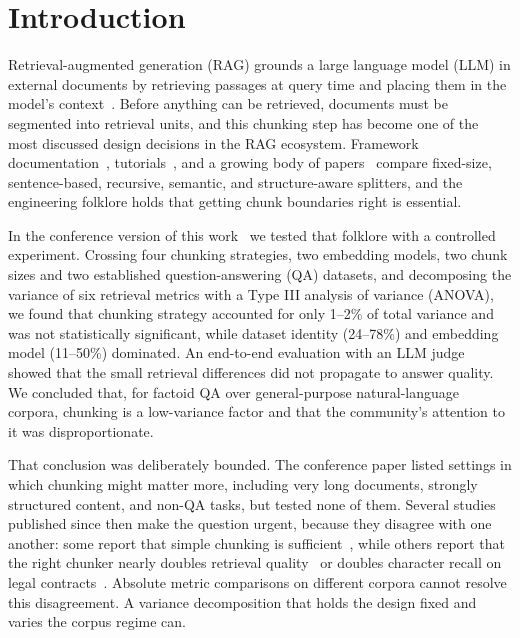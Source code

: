 \documentclass[runningheads]{llncs}
\begin{document}
\section{Introduction}
\label{sec:intro}

Retrieval-augmented generation (RAG) grounds a large language model (LLM) in external documents by retrieving passages at query time and placing them in the model's context~\cite{lewis2020rag,gao2023survey}. Before anything can be retrieved, documents must be segmented into retrieval units, and this chunking step has become one of the most discussed design decisions in the RAG ecosystem. Framework documentation~\cite{langchain2023,llamaindex2023}, tutorials~\cite{kamradt2023}, and a growing body of papers~\cite{jimenoyepes2024financial,qu2025semantic,duarte2024lumberchunker,zhao2024metachunking} compare fixed-size, sentence-based, recursive, semantic, and structure-aware splitters, and the engineering folklore holds that getting chunk boundaries right is essential.

In the conference version of this work~\cite{chauhan2026chunking} we tested that folklore with a controlled experiment. Crossing four chunking strategies, two embedding models, two chunk sizes and two established question-answering (QA) datasets, and decomposing the variance of six retrieval metrics with a Type III analysis of variance (ANOVA), we found that chunking strategy accounted for only 1--2\% of total variance and was not statistically significant, while dataset identity (24--78\%) and embedding model (11--50\%) dominated. An end-to-end evaluation with an LLM judge showed that the small retrieval differences did not propagate to answer quality. We concluded that, for factoid QA over general-purpose natural-language corpora, chunking is a low-variance factor and that the community's attention to it was disproportionate.

That conclusion was deliberately bounded. The conference paper listed settings in which chunking might matter more, including very long documents, strongly structured content, and non-QA tasks, but tested none of them. Several studies published since then make the question urgent, because they disagree with one another: some report that simple chunking is sufficient~\cite{bennani2026systematic,caspari2026complex,kreileder2026academic,li2025enhancing}, while others report that the right chunker nearly doubles retrieval quality~\cite{shaukat2026systematic} or doubles character recall on legal contracts~\cite{singh2026strucchunk}. Absolute metric comparisons on different corpora cannot resolve this disagreement. A variance decomposition that holds the design fixed and varies the corpus regime can.
\end{document}
